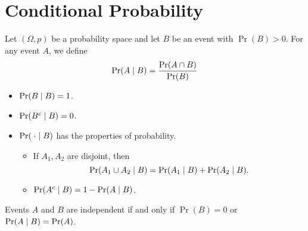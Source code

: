 
\section{Conditional Probability} \label{sec:conditional}

\begin{definition} \label{def:conditional}
    Let $(\Omega, p)$ be a probability space and let $B$ be an event with $\Pr(B) > 0$.
    For any event $A$, we define \[
        \Pr(A \mid B) = \frac{\Pr(A \cap B)}{\Pr(B)}
    \]
\end{definition}
\begin{remark} \leavevmode
    \begin{itemize}
        \item $\Pr(B \mid B) = 1$.
        \item $\Pr(B^{c} \mid B) = 0$.
        \item $\Pr(\;\cdot \mid B)$ has the properties of probability.
            \begin{itemize}
                \item If $A_1, A_2$ are disjoint, then \[
                    \Pr(A_1 \cup A_2 \mid B) = \Pr(A_1 \mid B) + \Pr(A_2 \mid B).
                \]
                \item $\Pr(A^c \mid B) = 1 - \Pr(A \mid B)$.
            \end{itemize}
    \end{itemize}
\end{remark}
\begin{remark}
    Events $A$ and $B$ are independent if and only if $\Pr(B) = 0$ or
    $\Pr(A \mid B) = \Pr(A)$.
\end{remark}
